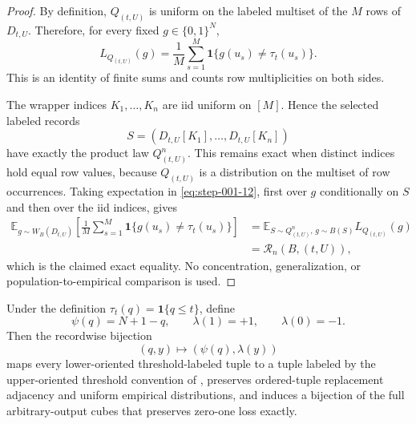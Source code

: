 \begin{proof}

By definition, \(Q_{(t,U)}\) is uniform on the labeled multiset of the \(M\) rows of \(D_{t,U}\). Therefore, for every fixed \(g \in \{0,1\}^N\),
\[
L_{Q_{(t,U)}}(g)
=\frac1M\sum_{s=1}^M
\mathbf 1\{g(u_s)\ne\tau_t(u_s)\}.
\tag{12}\label{eq:step-001-12}
\]
This is an identity of finite sums and counts row multiplicities on both sides.

The wrapper indices \(K_1,\ldots,K_n\) are iid uniform on \([M]\). Hence the selected labeled records
\[
S=(D_{t,U}[K_1],\ldots,D_{t,U}[K_n])
\]
have exactly the product law \(Q_{(t,U)}^n\). This remains exact when distinct indices hold equal row values, because \(Q_{(t,U)}\) is a distribution on the multiset of row occurrences. Taking expectation in \eqref{eq:step-001-12}, first over \(g\) conditionally on \(S\) and then over the iid indices, gives
\[
\begin{aligned}
\mathbb E_{g\sim W_B(D_{t,U})}
\left[\frac1M\sum_{s=1}^M
\mathbf 1\{g(u_s)\ne\tau_t(u_s)\}\right]
&=\mathbb E_{S\sim Q_{(t,U)}^n,\,g\sim B(S)}
L_{Q_{(t,U)}}(g)\\
&=\mathcal R_n(B,(t,U)),
\end{aligned}
\tag{13}\label{eq:step-001-13}
\]
which is the claimed exact equality. No concentration, generalization, or population-to-empirical comparison is used.

\end{proof}


\begin{proposition}
\label{prop:step-001-orientation}

Under the definition \(\tau_t(q)=\mathbf 1\{q\le t\}\), define
\[
\psi(q)=N+1-q,
\qquad
\lambda(1)=+1,
\qquad
\lambda(0)=-1.
\tag{14}\label{eq:step-001-14}
\]
Then the recordwise bijection
\[
(q,y)\longmapsto(\psi(q),\lambda(y))
\tag{15}\label{eq:step-001-15}
\]
maps every lower-oriented threshold-labeled tuple to a tuple labeled by the upper-oriented threshold convention of \citet{alonEtAl2018private}, preserves ordered-tuple replacement adjacency and uniform empirical distributions, and induces a bijection of the full arbitrary-output cubes that preserves zero-one loss exactly.

\end{proposition}

